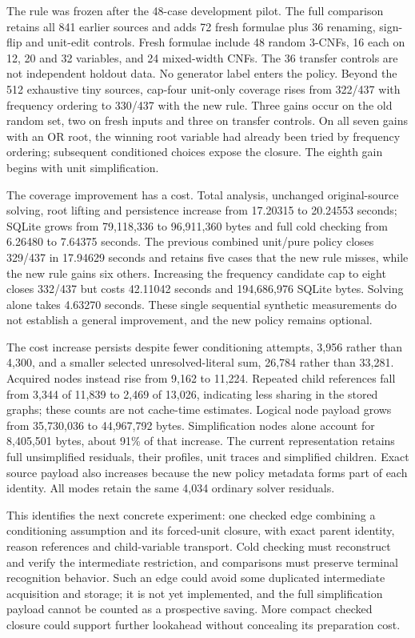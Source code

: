 \documentclass[11pt,a4paper]{article}
\numberwithin{equation}{section}
\theoremstyle{plain}
\theoremstyle{definition}
\theoremstyle{remark}
\begin{document}
The rule was frozen after the 48-case development pilot. The full comparison retains all 841 earlier sources and adds 72 fresh formulae plus 36 renaming, sign-flip and unit-edit controls. Fresh formulae include 48 random 3-CNFs, 16 each on 12, 20 and 32 variables, and 24 mixed-width CNFs. The 36 transfer controls are not independent holdout data. No generator label enters the policy. Beyond the 512 exhaustive tiny sources, cap-four unit-only coverage rises from 322/437 with frequency ordering to 330/437 with the new rule. Three gains occur on the old random set, two on fresh inputs and three on transfer controls. On all seven gains with an OR root, the winning root variable had already been tried by frequency ordering; subsequent conditioned choices expose the closure. The eighth gain begins with unit simplification.

The coverage improvement has a cost. Total analysis, unchanged original-source solving, root lifting and persistence increase from 17.20315 to 20.24553 seconds; SQLite grows from 79,118,336 to 96,911,360 bytes and full cold checking from 6.26480 to 7.64375 seconds. The previous combined unit/pure policy closes 329/437 in 17.94629 seconds and retains five cases that the new rule misses, while the new rule gains six others. Increasing the frequency candidate cap to eight closes 332/437 but costs 42.11042 seconds and 194,686,976 SQLite bytes. Solving alone takes 4.63270 seconds. These single sequential synthetic measurements do not establish a general improvement, and the new policy remains optional.

The cost increase persists despite fewer conditioning attempts, 3,956 rather than 4,300, and a smaller selected unresolved-literal sum, 26,784 rather than 33,281. Acquired nodes instead rise from 9,162 to 11,224. Repeated child references fall from 3,344 of 11,839 to 2,469 of 13,026, indicating less sharing in the stored graphs; these counts are not cache-time estimates. Logical node payload grows from 35,730,036 to 44,967,792 bytes. Simplification nodes alone account for 8,405,501 bytes, about 91\% of that increase. The current representation retains full unsimplified residuals, their profiles, unit traces and simplified children. Exact source payload also increases because the new policy metadata forms part of each identity. All modes retain the same 4,034 ordinary solver residuals.

This identifies the next concrete experiment: one checked edge combining a conditioning assumption and its forced-unit closure, with exact parent identity, reason references and child-variable transport. Cold checking must reconstruct and verify the intermediate restriction, and comparisons must preserve terminal recognition behavior. Such an edge could avoid some duplicated intermediate acquisition and storage; it is not yet implemented, and the full simplification payload cannot be counted as a prospective saving. More compact checked closure could support further lookahead without concealing its preparation cost.
\end{document}
